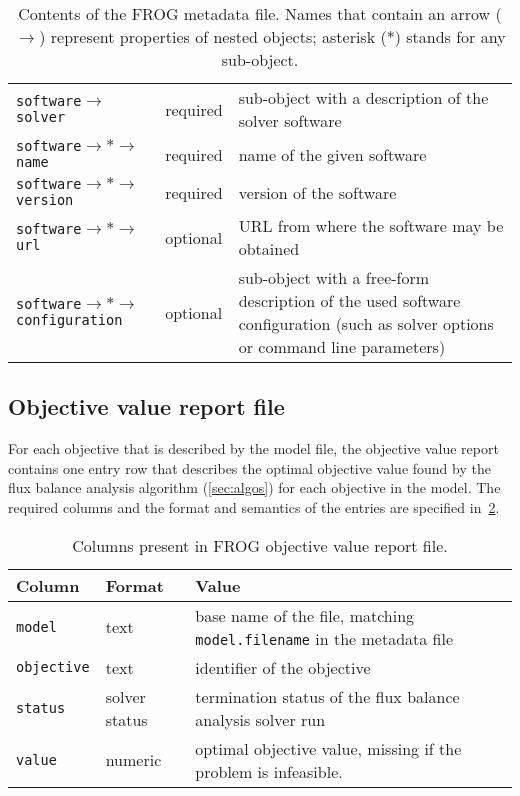 \begin{table}
\begin{tabular}{llp{30em}}
 \\
\verb|software|$\to$\verb|solver|
 & required
 & sub-object with a description of the solver software
 \\\addlinespace
\verb|software|$\to\ast\to$\verb|name|
 & required
 & name of the given software
 \\
\verb|software|$\to\ast\to$\verb|version|
 & required
 & version of the software
 \\
\verb|software|$\to\ast\to$\verb|url|
 & optional
 & URL from where the software may be obtained
 \\
\verb|software|$\to\ast\to$\verb|configuration|
 & optional
 & sub-object with a free-form description of the used software configuration (such as solver options or command line parameters)
 \\
\bottomrule
\end{tabular}
\caption[Contents of the FROG metadata file.]{Contents of the FROG metadata file. Names that contain an arrow ($\to$) represent properties of nested objects; asterisk ($\ast$) stands for any sub-object.}
\label{tab:metadata}
\end{table}

\subsection{Objective value report file}
\label{sec:obj}

For each objective that is described by the model file, the objective value report contains one entry row that describes the optimal objective value found by the flux balance analysis algorithm (\cref{sec:algos}) for each objective in the model. The required columns and the format and semantics of the entries are specified in~\cref{tab:objfields}.

\begin{table}\tablefont
\begin{tabular}{llp{30em}}
\toprule
Column & Format & Value \\
\midrule
\verb|model|
 & text
 & base name of the file, matching \verb|model.filename| in the metadata file
 \\
\verb|objective|
 & text
 & identifier of the objective
 \\
\verb|status|
 & solver status
 & termination status of the flux balance analysis solver run
 \\
\verb|value|
 & numeric
 & optimal objective value, missing if the problem is infeasible.
 \\
\bottomrule
\end{tabular}
\caption{Columns present in FROG objective value report file.}
\label{tab:objfields}
\end{table}

